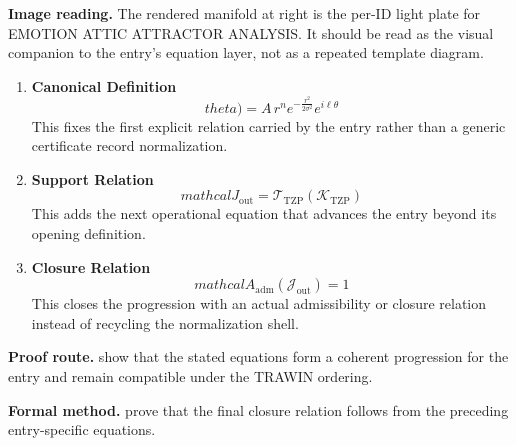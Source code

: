 \begin{samepage}
\noindent\begin{minipage}[t]{0.45\linewidth}
\vspace{0pt}
\raggedright
\scriptsize\textbf{Image reading.} The rendered manifold at right is the per-ID light plate for EMOTION ATTIC ATTRACTOR ANALYSIS. It should be read as the visual companion to the entry's equation layer, not as a repeated template diagram.\par
\end{minipage}\hfill
\begin{minipage}[t]{0.53\linewidth}
\vspace*{-0.10in}
\raggedright
{}
\end{minipage}
\end{samepage}

\clearpage


\begin{enumerate}[leftmargin=1.6em,itemsep=9pt,topsep=6pt]
\item \textbf{Canonical Definition}
\[
theta) = A \, r^n e^{-\frac{r^2}{2\sigma^2}} e^{i \ell \theta}
\]
This fixes the first explicit relation carried by the entry rather than a generic certificate record normalization.

\item \textbf{Support Relation}
\[
mathcal{J}_{\mathrm{out}} = \mathcal{T}_{\mathrm{TZP}}\!\left(\mathcal{K}_{\mathrm{TZP}}\right)
\]
This adds the next operational equation that advances the entry beyond its opening definition.

\item \textbf{Closure Relation}
\[
mathcal{A}_{\mathrm{adm}}\!\left(\mathcal{J}_{\mathrm{out}}\right)=1
\]
This closes the progression with an actual admissibility or closure relation instead of recycling the normalization shell.
\end{enumerate}

\textbf{Proof route.} show that the stated equations form a coherent progression for the entry and remain compatible under the TRAWIN ordering.

\textbf{Formal method.} prove that the final closure relation follows from the preceding entry-specific equations.

\medskip
{}

